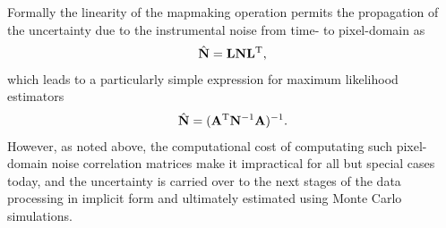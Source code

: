 Formally the linearity of the mapmaking operation permits the propagation of the uncertainty due to the instrumental noise from time- to pixel-domain as
\begin{eqnarray}
{\hat{\mathbf{N}}} = \mathbf{L} \mathbf{N} \mathbf{L}^{\rm T},
\end{eqnarray}
which leads to a particularly simple expression for maximum likelihood estimators 
\begin{eqnarray}
{\hat{\mathbf{N}}} = (\mathbf{A}^{\rm T} \mathbf{N}^{-1} \mathbf{A})^{-1}.
\end{eqnarray}
However, as noted above, the computational cost of computating such pixel-domain noise correlation matrices make it impractical for all but special cases today, and the uncertainty is carried over to the next stages of the data processing in implicit form and ultimately estimated using Monte Carlo simulations.
